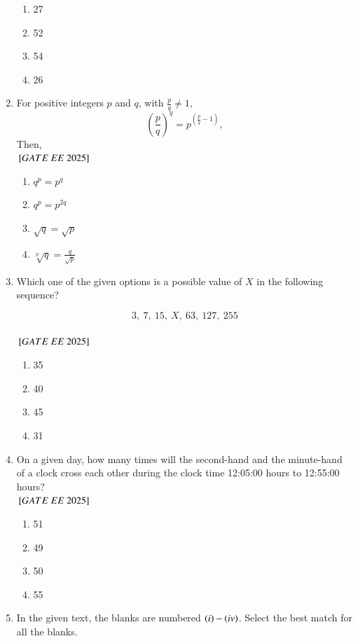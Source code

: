 \documentclass[journal,12pt,onecolumn]{IEEEtran}
\theoremstyle{remark}
\begin{document}
\begin{enumerate}
\begin{enumerate}[label=(\Alph*)]
\item 27\\   
  \item 52\\
  \item 54\\
  \item 26 \\   
  \end{enumerate}
   \item For positive integers \( p \) and \( q \), with \( \frac{p}{q} \neq 1 \), 
\[
\left( \frac{p}{q} \right)^q = p^{\left( \frac{p}{q} - 1 \right)},
\]
Then,\\
${}\left[GATE\ EE\ 2025\right]$\\
    \begin{enumerate}[label=(\Alph*)]
  \item\( q^p = p^q \)\\  
 \item \( q^p = p^{2q} \)\\
  \item \( \sqrt{q} = \sqrt{p} \)\\
  \item \( \sqrt[p]{q} = \frac{q}{\sqrt{p}} \) \\   
  \end{enumerate}
 
\item  Which one of the given options is a possible value of \( X \) in the following sequence?

\[
3,\ 7,\ 15,\ X,\ 63,\ 127,\ 255
\]\\
${}\left[GATE\ EE\ 2025\right]$\\
    \begin{enumerate}[label=(\Alph*)]

   \item 35 \\   
  \item 40\\
  \item 45\\
  \item 31\\
    \end{enumerate}
\item  On a given day, how many times will the second-hand and the minute-hand of a clock cross each other during the clock time 12:05:00 hours to 12:55:00 hours?\\
${}\left[GATE\ EE\ 2025\right]$\\
    \begin{enumerate}[label=(\Alph*)]
  \item 51\\ 
  \item 49\\  
  \item 50\\  
  \item 55\\  
    \end{enumerate}
\item In the given text, the blanks are numbered $\left(i\right)- \left(iv\right)$. Select the best match for all the blanks.


\end{enumerate}
\end{document}
